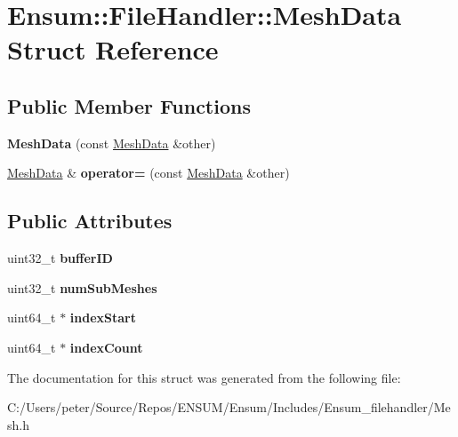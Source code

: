 \hypertarget{struct_ensum_1_1_file_handler_1_1_mesh_data}{}\section{Ensum\+:\+:File\+Handler\+:\+:Mesh\+Data Struct Reference}
\label{struct_ensum_1_1_file_handler_1_1_mesh_data}
\subsection*{Public Member Functions}
\begin{DoxyCompactItemize}
\item 
{\bfseries Mesh\+Data} (const \hyperlink{struct_ensum_1_1_file_handler_1_1_mesh_data}{Mesh\+Data} \&other)\hypertarget{struct_ensum_1_1_file_handler_1_1_mesh_data_a2860e91af617fb3be7145acd3ab3ac90}{}\label{struct_ensum_1_1_file_handler_1_1_mesh_data_a2860e91af617fb3be7145acd3ab3ac90}

\item 
\hyperlink{struct_ensum_1_1_file_handler_1_1_mesh_data}{Mesh\+Data} \& {\bfseries operator=} (const \hyperlink{struct_ensum_1_1_file_handler_1_1_mesh_data}{Mesh\+Data} \&other)\hypertarget{struct_ensum_1_1_file_handler_1_1_mesh_data_a82b70f364ae3e8e2abeab1f7372069f9}{}\label{struct_ensum_1_1_file_handler_1_1_mesh_data_a82b70f364ae3e8e2abeab1f7372069f9}

\end{DoxyCompactItemize}
\subsection*{Public Attributes}
\begin{DoxyCompactItemize}
\item 
uint32\+\_\+t {\bfseries buffer\+ID}\hypertarget{struct_ensum_1_1_file_handler_1_1_mesh_data_a9363dc6018bd3866bef535efba7de0e2}{}\label{struct_ensum_1_1_file_handler_1_1_mesh_data_a9363dc6018bd3866bef535efba7de0e2}

\item 
uint32\+\_\+t {\bfseries num\+Sub\+Meshes}\hypertarget{struct_ensum_1_1_file_handler_1_1_mesh_data_aebcda9f23d590970590dfe144131dc0f}{}\label{struct_ensum_1_1_file_handler_1_1_mesh_data_aebcda9f23d590970590dfe144131dc0f}

\item 
uint64\+\_\+t $\ast$ {\bfseries index\+Start}\hypertarget{struct_ensum_1_1_file_handler_1_1_mesh_data_a62448a9ab27473cfc6649c515fb4248d}{}\label{struct_ensum_1_1_file_handler_1_1_mesh_data_a62448a9ab27473cfc6649c515fb4248d}

\item 
uint64\+\_\+t $\ast$ {\bfseries index\+Count}\hypertarget{struct_ensum_1_1_file_handler_1_1_mesh_data_a406c6cfb40639a760121d6ccb0c5cab9}{}\label{struct_ensum_1_1_file_handler_1_1_mesh_data_a406c6cfb40639a760121d6ccb0c5cab9}

\end{DoxyCompactItemize}


The documentation for this struct was generated from the following file\+:\begin{DoxyCompactItemize}
\item 
C\+:/\+Users/peter/\+Source/\+Repos/\+E\+N\+S\+U\+M/\+Ensum/\+Includes/\+Ensum\+\_\+filehandler/Mesh.\+h\end{DoxyCompactItemize}
